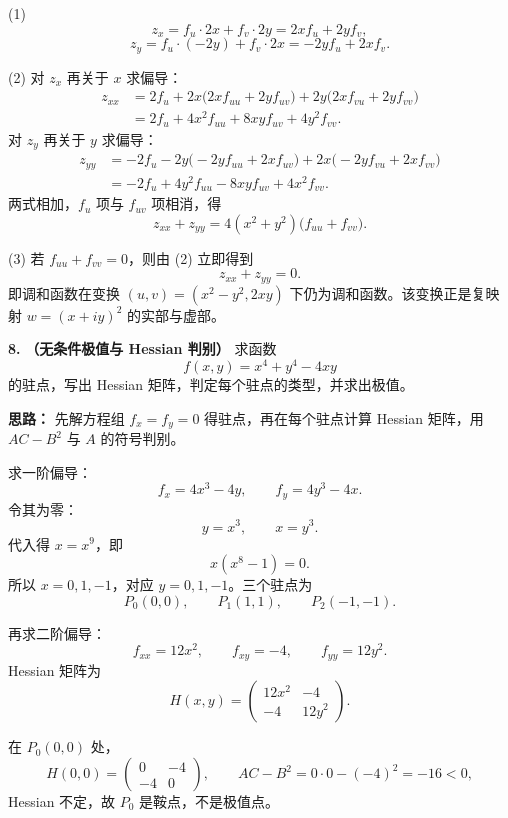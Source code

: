 (1)
\[
z_x=f_u\cdot2x+f_v\cdot2y=2xf_u+2yf_v,
\]
\[
z_y=f_u\cdot(-2y)+f_v\cdot2x=-2yf_u+2xf_v.
\]

(2) 对 \(z_x\) 再关于 \(x\) 求偏导：
\[
\begin{aligned}
z_{xx}
&=2f_u+2x\bigl(2xf_{uu}+2yf_{uv}\bigr)
 +2y\bigl(2xf_{vu}+2yf_{vv}\bigr)\\
&=2f_u+4x^2f_{uu}+8xyf_{uv}+4y^2f_{vv}.
\end{aligned}
\]
对 \(z_y\) 再关于 \(y\) 求偏导：
\[
\begin{aligned}
z_{yy}
&=-2f_u-2y\bigl(-2yf_{uu}+2xf_{uv}\bigr)
 +2x\bigl(-2yf_{vu}+2xf_{vv}\bigr)\\
&=-2f_u+4y^2f_{uu}-8xyf_{uv}+4x^2f_{vv}.
\end{aligned}
\]
两式相加，\(f_u\) 项与 \(f_{uv}\) 项相消，得
\[
z_{xx}+z_{yy}
=4(x^2+y^2)\bigl(f_{uu}+f_{vv}\bigr).
\]

(3) 若 \(f_{uu}+f_{vv}=0\)，则由 (2) 立即得到
\[
z_{xx}+z_{yy}=0.
\]
即调和函数在变换 \((u,v)=(x^2-y^2,2xy)\) 下仍为调和函数。该变换正是复映射 \(w=(x+iy)^2\) 的实部与虚部。

\else \answerarea[10] \fi%

\textbf{8.} \textbf{（无条件极值与 Hessian 判别）} 求函数
\[
f(x,y)=x^4+y^4-4xy
\]
的驻点，写出 Hessian 矩阵，判定每个驻点的类型，并求出极值。

\ifshowsolutions%
\textbf{思路：} 先解方程组 \(f_x=f_y=0\) 得驻点，再在每个驻点计算 Hessian 矩阵，用 \(AC-B^2\) 与 \(A\) 的符号判别。

求一阶偏导：
\[
f_x=4x^3-4y,\qquad f_y=4y^3-4x.
\]
令其为零：
\[
y=x^3,\qquad x=y^3.
\]
代入得 \(x=x^9\)，即
\[
x(x^8-1)=0.
\]
所以 \(x=0,1,-1\)，对应 \(y=0,1,-1\)。三个驻点为
\[
P_0(0,0),\qquad P_1(1,1),\qquad P_2(-1,-1).
\]

再求二阶偏导：
\[
f_{xx}=12x^2,\qquad f_{xy}=-4,\qquad f_{yy}=12y^2.
\]
Hessian 矩阵为
\[
H(x,y)=
\begin{pmatrix}
12x^2 & -4\\
-4 & 12y^2
\end{pmatrix}.
\]

在 \(P_0(0,0)\) 处，
\[
H(0,0)=\begin{pmatrix}0&-4\\-4&0\end{pmatrix},
\qquad
AC-B^2=0\cdot0-(-4)^2=-16<0,
\]
Hessian 不定，故 \(P_0\) 是鞍点，不是极值点。

